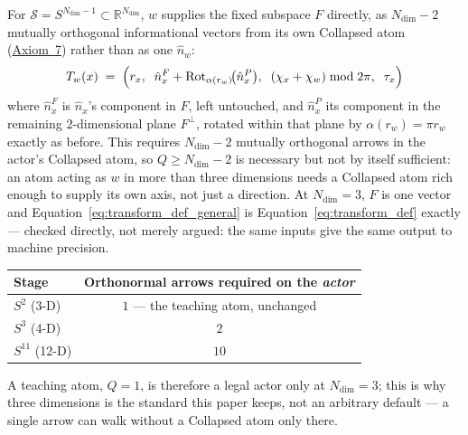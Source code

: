 \documentclass[12pt, a4paper]{article}
\begin{document}
For $\mathcal{S}=S^{N_{\mathrm{dim}}-1}\subset\mathbb{R}^{N_{\mathrm{dim}}}$,
$w$ supplies the fixed subspace $F$ directly, as $N_{\mathrm{dim}}-2$
mutually orthogonal informational vectors from its own Collapsed atom
(\hyperref[subsec:axiom_v1_metrics]{Axiom~7}) rather than as one $\hat n_w$:
\begin{equation}
    T_w(x)
    \;=\;
    \Bigl(
        r_x,\;\;
        \hat n_x^F + \mathrm{Rot}_{\alpha(r_w)}\!\bigl(\hat n_x^P\bigr),\;\;
        (\chi_x + \chi_w) \bmod 2\pi,\;\;
        \tau_x
    \Bigr)
    \label{eq:transform_def_general}
\end{equation}
where $\hat n_x^F$ is $\hat n_x$'s component in $F$, left untouched,
and $\hat n_x^P$ its component in the remaining $2$-dimensional plane
$F^\perp$, rotated within that plane by $\alpha(r_w)=\pi r_w$ exactly
as before. This requires $N_{\mathrm{dim}}-2$ mutually orthogonal
arrows in the actor's Collapsed atom, so $Q\ge N_{\mathrm{dim}}-2$ is
necessary but not by itself sufficient: an atom acting as
$w$ in more than three dimensions needs a Collapsed atom rich enough to
supply its own axis, not just a direction. At $N_{\mathrm{dim}}=3$,
$F$ is one vector and Equation~\eqref{eq:transform_def_general} is
Equation~\eqref{eq:transform_def} exactly --- checked directly, not
merely argued: the same inputs give the same output to machine
precision.

\begin{center}
\begin{tabular}{lc}
Stage & Orthonormal arrows required on the \emph{actor} \\
\hline
$S^2$ (3-D) & $1$ --- the teaching atom, unchanged \\
$S^3$ (4-D) & $2$ \\
$S^{11}$ (12-D) & $10$ \\
\end{tabular}
\end{center}
A teaching atom, $Q=1$, is therefore a legal actor only at
$N_{\mathrm{dim}}=3$; this is why three dimensions is the standard
this paper keeps, not an arbitrary default --- a single arrow can
walk without a Collapsed atom only there.
\end{document}
